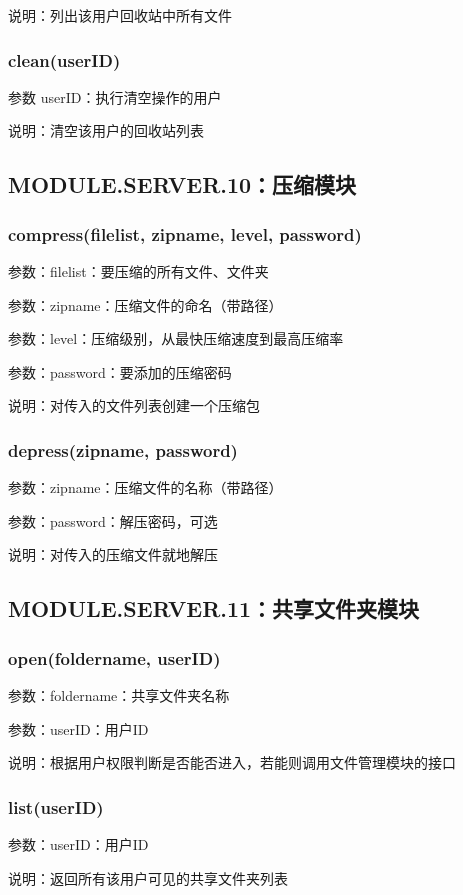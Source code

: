 说明：列出该用户回收站中所有文件

\subsubsection{clean(userID)}
参数 userID：执行清空操作的用户

说明：清空该用户的回收站列表

\subsection{MODULE.SERVER.10：压缩模块}
\subsubsection{compress(filelist, zipname, level, password)}

参数：filelist：要压缩的所有文件、文件夹

参数：zipname：压缩文件的命名（带路径）

参数：level：压缩级别，从最快压缩速度到最高压缩率

参数：password：要添加的压缩密码

说明：对传入的文件列表创建一个压缩包

\subsubsection{depress(zipname, password)}
参数：zipname：压缩文件的名称（带路径）

参数：password：解压密码，可选

说明：对传入的压缩文件就地解压

\subsection{MODULE.SERVER.11：共享文件夹模块}
\subsubsection{open(foldername, userID)}
参数：foldername：共享文件夹名称

参数：userID：用户ID

说明：根据用户权限判断是否能否进入，若能则调用文件管理模块的接口
 
\subsubsection{list(userID)}
参数：userID：用户ID

说明：返回所有该用户可见的共享文件夹列表


